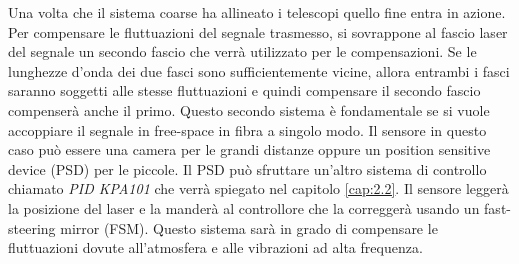 Una volta che il sistema coarse ha allineato i telescopi quello fine entra in azione. Per compensare le fluttuazioni del segnale trasmesso, si sovrappone al fascio laser del segnale un secondo fascio che verrà utilizzato per le compensazioni. Se le lunghezze d'onda dei due fasci sono sufficientemente vicine, allora entrambi i fasci saranno soggetti alle stesse fluttuazioni e quindi compensare il secondo fascio compenserà anche il primo.
Questo secondo sistema è fondamentale se si vuole accoppiare il segnale in free-space in fibra a singolo modo.
Il sensore in questo caso può essere una camera per le grandi distanze oppure un position sensitive device (PSD) per le piccole. Il PSD può sfruttare un'altro sistema di controllo chiamato \textit{PID KPA101} che verrà spiegato nel capitolo \ref{cap:2.2}. Il sensore leggerà la posizione del laser e la manderà al controllore che la correggerà usando un fast-steering mirror (FSM). Questo sistema sarà in grado di compensare le fluttuazioni dovute all'atmosfera e alle vibrazioni ad alta frequenza.

